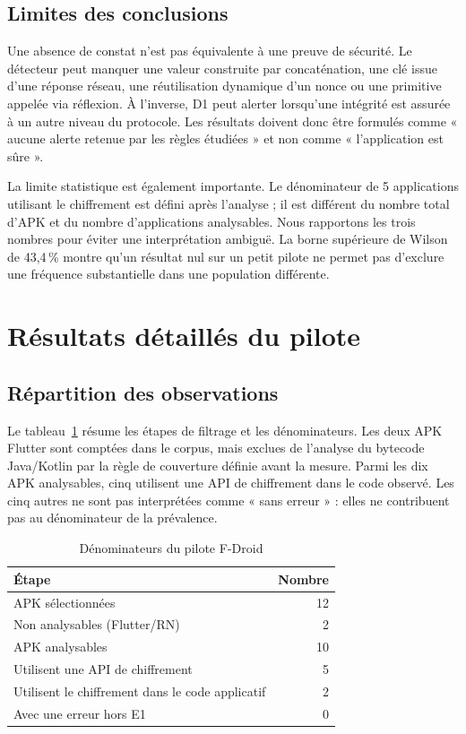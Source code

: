 \documentclass[conference,a4paper]{IEEEtran}
\begin{document}
\subsection{Limites des conclusions}
Une absence de constat n'est pas équivalente à une preuve de sécurité. Le détecteur peut manquer une valeur construite par concaténation, une clé issue d'une réponse réseau, une réutilisation dynamique d'un nonce ou une primitive appelée via réflexion. À l'inverse, D1 peut alerter lorsqu'une intégrité est assurée à un autre niveau du protocole. Les résultats doivent donc être formulés comme « aucune alerte retenue par les règles étudiées » et non comme « l'application est sûre ».

La limite statistique est également importante. Le dénominateur de 5 applications utilisant le chiffrement est défini après l'analyse ; il est différent du nombre total d'APK et du nombre d'applications analysables. Nous rapportons les trois nombres pour éviter une interprétation ambiguë. La borne supérieure de Wilson de 43,4\,\% montre qu'un résultat nul sur un petit pilote ne permet pas d'exclure une fréquence substantielle dans une population différente.

\section{Résultats détaillés du pilote}

\subsection{Répartition des observations}
Le tableau~\ref{tab:pilote-detail} résume les étapes de filtrage et les dénominateurs. Les deux APK Flutter sont comptées dans le corpus, mais exclues de l'analyse du bytecode Java/Kotlin par la règle de couverture définie avant la mesure. Parmi les dix APK analysables, cinq utilisent une API de chiffrement dans le code observé. Les cinq autres ne sont pas interprétées comme « sans erreur » : elles ne contribuent pas au dénominateur de la prévalence.

\begin{table}[t]
\caption{Dénominateurs du pilote F-Droid}
\label{tab:pilote-detail}
\centering\small
\begin{tabular}{lr}
\toprule
Étape & Nombre \\
\midrule
APK sélectionnées & 12 \\
Non analysables (Flutter/RN) & 2 \\
APK analysables & 10 \\
Utilisent une API de chiffrement & 5 \\
Utilisent le chiffrement dans le code applicatif & 2 \\
Avec une erreur hors E1 & 0 \\
\bottomrule
\end{tabular}
\end{table}
\end{document}
